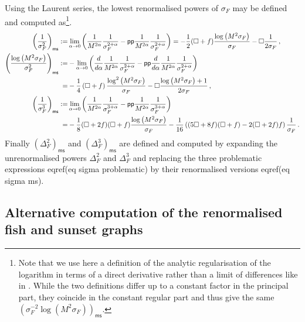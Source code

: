 \documentclass[10pt]{book}
\newcommand{\pp}{\mathsf{pp}}
\newcommand{\ms}{\mathsf{ms}}
\theoremstyle{break}
\begin{document}
Using the Laurent series, the lowest renormalised powers of $\sigma_F$ may be defined and computed as\footnote{Note that we use here a definition of the analytic regularisation of the logarithm in terms of a direct derivative rather than a limit of differences like in .%
While the two definitions differ up to a constant factor in the principal part, they coincide in the constant regular part and thus give the same 
$(
\sigma^{-2}_F \log (M^2 \sigma_F))_\ms$.}.
%
\begin{align}\left(\frac{1}{\sigma_F^2}\right)_\ms:=&\lim_{\alpha\to 0}\left(\frac{1}{M^{2\alpha}}\frac{1}{\sigma^{2+\alpha}_F}-\pp\frac{1}{M^{2\alpha}}\frac{1}{\sigma^{2+\alpha}_F}\right)=-\frac{1}{2}(\Box+f)\frac{\log \left(M^2 \sigma_F\right)}{\sigma_F}-\Box \frac{1}{2\sigma_F}\,,\notag\\
%
\left(\frac{\log \left(M^2\sigma_F\right)}{\sigma_F^2}\right)_\ms:=&-\lim_{\alpha\to 0}\left(\frac{d}{d\alpha}\frac{1}{M^{2\alpha}}\frac{1}{\sigma^{2+\alpha}_F}-\pp\frac{d}{d\alpha}\frac{1}{M^{2\alpha}}\frac{1}{\sigma^{2+\alpha}_F}\right)\\=&-\frac14\left(\Box+f\right)\frac{\log^2 \left(M^2 \sigma_F\right)}{\sigma_F}-\Box\frac{\log \left(M^2 \sigma_F\right)+1}{2\sigma_F}\,,\notag\\
%
\left(\frac{1}{\sigma_F^3}\right)_\ms:=&\lim_{\alpha\to 0}\left(\frac{1}{M^{2\alpha}}\frac{1}{\sigma^{3+\alpha}_F}-\pp\frac{1}{M^{2\alpha}}\frac{1}{\sigma^{3+\alpha}_F}\right)\notag\\=&-\frac{1}{8}(\Box+2f)(\Box+f)\frac{\log \left(M^2 \sigma_F\right)}{\sigma_F}-\frac{1}{16} \left((5\Box+8f)
(\Box+f)-2(\Box+2f)f\right) \frac{1}{\sigma_F}\,.\notag\end{align}
%
Finally $\left(\Delta^2_F\right)_\ms$ and $\left(\Delta^3_F\right)_\ms$ are defined and computed by expanding the unrenormalised powers $\Delta^2_F$ and $\Delta^3_F$ and replacing the three problematic expressions eqref(eq sigma problematic)
by their renormalised versions eqref(eq sigma ms).


\subsection{Alternative computation of the renormalised fish and sunset graphs}
\end{document}
